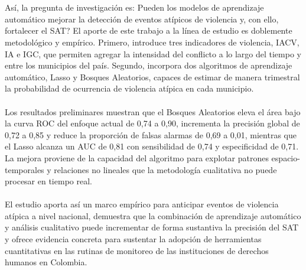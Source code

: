 \\\\
Así, la pregunta de investigación es: \¿Pueden los modelos de aprendizaje automático mejorar la detección de eventos atípicos de violencia y, con ello, fortalecer el SAT? El aporte de este trabajo a la línea de estudio es doblemente metodológico y empírico. Primero, introduce tres indicadores de violencia, IACV, IA e IGC, que permiten agregar la intensidad del conflicto a lo largo del tiempo y entre los municipios del país. Segundo, incorpora dos algoritmos de aprendizaje automático, Lasso y Bosques Aleatorios, capaces de estimar de manera trimestral la probabilidad de ocurrencia de violencia atípica en cada municipio.
\\\\
Los resultados preliminares muestran que el Bosques Aleatorios eleva el área bajo la curva ROC del enfoque actual de 0,74 a 0,90, incrementa la precisión global de 0,72 a 0,85 y reduce la proporción de falsas alarmas de 0,69 a 0,01, mientras que el Lasso alcanza un AUC de 0,81 con sensibilidad de 0,74 y especificidad de 0,71. La mejora proviene de la capacidad del algoritmo para explotar patrones espacio-temporales y relaciones no lineales que la metodología cualitativa no puede procesar en tiempo real.
\\\\
El estudio aporta así un marco empírico para anticipar eventos de violencia atípica a nivel nacional, demuestra que la combinación de aprendizaje automático y análisis cualitativo puede incrementar de forma sustantiva la precisión del SAT y ofrece evidencia concreta para sustentar la adopción de herramientas cuantitativas en las rutinas de monitoreo de las instituciones de derechos humanos en Colombia.